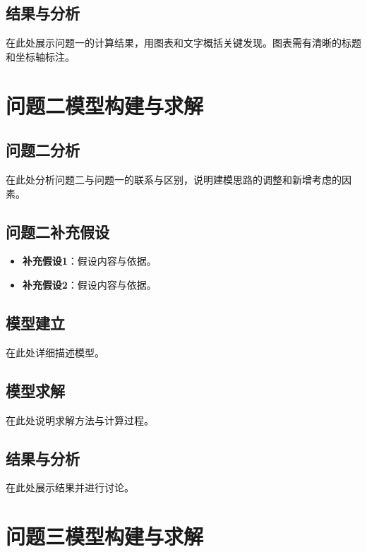 \documentclass[12pt,a4paper]{article}
\begin{document}
\subsection{结果与分析}

在此处展示问题一的计算结果，用图表和文字概括关键发现。图表需有清晰的标题和坐标轴标注。

\section{问题二模型构建与求解}

\subsection{问题二分析}

在此处分析问题二与问题一的联系与区别，说明建模思路的调整和新增考虑的因素。

\subsection{问题二补充假设}

\begin{itemize}
    \item \textbf{补充假设1}：假设内容与依据。
    \item \textbf{补充假设2}：假设内容与依据。
\end{itemize}

\subsection{模型建立}

在此处详细描述模型。

\subsection{模型求解}

在此处说明求解方法与计算过程。

\subsection{结果与分析}

在此处展示结果并进行讨论。

\section{问题三模型构建与求解}
\end{document}
